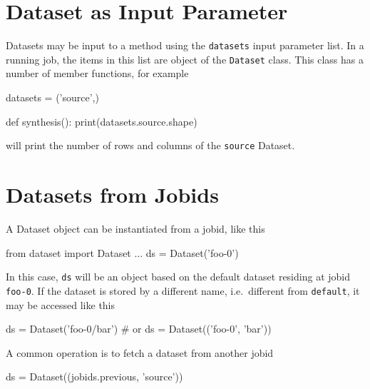 \section{Dataset as Input Parameter}
Datasets may be input to a method using the \texttt{datasets} input
parameter list.  In a running job, the items in this list are object
of the \texttt{Dataset} class.  This class has a number of member
functions, for example
\begin{python}
datasets = ('source',)

def synthesis():
  print(datasets.source.shape)
\end{python}
will print the number of rows and columns of the \texttt{source}
Dataset.


\section{Datasets from Jobids}
A Dataset object can be
instantiated from a jobid, like this
\begin{python}
from dataset import Dataset
...
ds = Dataset('foo-0')
\end{python}
In this case, \texttt{ds} will be an object based on the default
dataset residing at jobid \texttt{foo-0}.  If the dataset is stored by
a different name, i.e.\ different from \texttt{default}, it may be
accessed like this
\begin{python}
ds = Dataset('foo-0/bar')
# or
ds = Dataset(('foo-0', 'bar'))
\end{python}
A common operation is to fetch a dataset from another jobid
\begin{python}
ds = Dataset((jobids.previous, 'source'))
\end{python}







